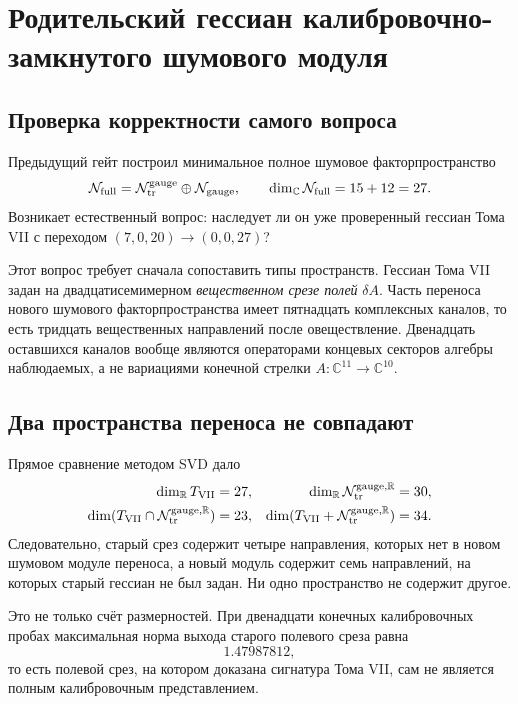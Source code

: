 \chapter{Родительский гессиан калибровочно-замкнутого шумового модуля}
\label{ch:v8-gauge-closed-noise-parent-hessian-gate}

\section{Проверка корректности самого вопроса}

Предыдущий гейт построил минимальное полное шумовое факторпространство
\begin{equation}
 \mathcal N_{\rm full}
 =\mathcal N_{\rm tr}^{\rm gauge}\oplus\mathcal N_{\rm gauge},
 \qquad \dim_{\mathbb C}\mathcal N_{\rm full}=15+12=27.
 \label{eq:v8-full-noise-splitting-for-parent-test}
\end{equation}
Возникает естественный вопрос: наследует ли он уже проверенный гессиан
Тома VII с переходом $(7,0,20)\to(0,0,27)$?

Этот вопрос требует сначала сопоставить типы пространств. Гессиан Тома VII
задан на двадцатисемимерном \emph{вещественном срезе полей} $\delta A$.
Часть переноса нового шумового факторпространства имеет пятнадцать комплексных каналов,
то есть тридцать вещественных направлений после овеществление. Двенадцать
оставшихся каналов вообще являются операторами концевых секторов алгебры
наблюдаемых, а не вариациями конечной стрелки $A:\mathbb C^{11}\to
\mathbb C^{10}$.

\section{Два пространства переноса не совпадают}

Прямое сравнение методом SVD дало
\begin{align}
 \dim_{\mathbb R}T_{\rm VII}&=27,&
 \dim_{\mathbb R}\mathcal N_{\rm tr}^{\rm gauge,\mathbb R}&=30,\\
 \dim(T_{\rm VII}\cap\mathcal N_{\rm tr}^{\rm gauge,\mathbb R})&=23,&
 \dim(T_{\rm VII}+\mathcal N_{\rm tr}^{\rm gauge,\mathbb R})&=34.
 \label{eq:v8-field-noise-space-intersection}
\end{align}
Следовательно, старый срез содержит четыре направления, которых нет в новом
шумовом модуле переноса, а новый модуль содержит семь направлений, на которых
старый гессиан не был задан. Ни одно пространство не содержит другое.

Это не только счёт размерностей. При двенадцати конечных калибровочных пробах
максимальная норма выхода старого полевого среза равна
\begin{equation}
 1.47987812,
 \label{eq:v8-old-field-slice-gauge-leakage}
\end{equation}
то есть полевой срез, на котором доказана сигнатура Тома VII, сам не является
полным калибровочным представлением.

